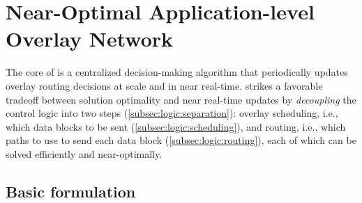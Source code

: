 \section{Near-Optimal Application-level Overlay Network}
\label{sec:logic}

The core of \name is a centralized decision-making algorithm that
periodically updates overlay routing decisions at scale and in near
real-time. \name strikes a favorable tradeoff
between solution optimality and near real-time updates by
{\em decoupling} the control logic into two steps
(\Section\ref{subsec:logic:separation}):
overlay scheduling, i.e., which data blocks to be sent
(\Section\ref{subsec:logic:scheduling}),
and routing, i.e., which paths to use to send each data block
(\Section\ref{subsec:logic:routing}), each of which
can be solved efficiently and near-optimally.%

\subsection{Basic formulation}
\label{subsec:logic:formulation}


